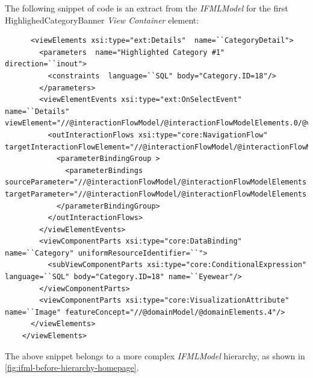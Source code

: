 The following snippet of code is an extract from the \textit{IFMLModel} for the first HighlighedCategoryBanner \textit{View Container} element: 
\vspace{0.5cm}
\lstset{language=XML}
\begin{lstlisting} 
      <viewElements xsi:type="ext:Details"  name=``CategoryDetail">
        <parameters  name="Highlighted Category #1" direction=``inout">
          <constraints  language=``SQL" body="Category.ID=18"/>
        </parameters>
        <viewElementEvents xsi:type="ext:OnSelectEvent"  name=``Details" viewElement="//@interactionFlowModel/@interactionFlowModelElements.0/@viewElements.0/@viewElements.0">
          <outInteractionFlows xsi:type="core:NavigationFlow"  targetInteractionFlowElement="//@interactionFlowModel/@interactionFlowModelElements.6">
            <parameterBindingGroup >
              <parameterBindings  sourceParameter="//@interactionFlowModel/@interactionFlowModelElements.0/@viewElements.0/@viewElements.0/@viewElements.0/@parameters.0" targetParameter="//@interactionFlowModel/@interactionFlowModelElements.6/@parameters.0"/>
            </parameterBindingGroup>
          </outInteractionFlows>
        </viewElementEvents>
        <viewComponentParts xsi:type="core:DataBinding"  name=``Category" uniformResourceIdentifier=``">
          <subViewComponentParts xsi:type="core:ConditionalExpression"  language=``SQL" body="Category.ID=18" name=``Eyewear"/>
        </viewComponentParts>
        <viewComponentParts xsi:type="core:VisualizationAttribute"  name=``Image" featureConcept="//@domainModel/@domainElements.4"/>
      </viewElements>
    </viewElements>
\end{lstlisting}

The above snippet belongs to a more complex \textit{IFMLModel} hierarchy, as shown in \ref{fig:ifml-before-hierarchy-homepage}.

